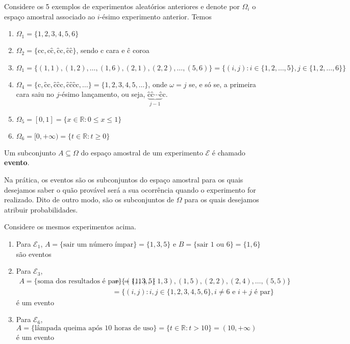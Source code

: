 \documentclass[../Notas.tex]{subfiles}
\begin{document}
\begin{examples}
Considere os 5 exemplos de experimentos aleatórios anteriores e denote por $\Omega_i$ o espaço amostral associado ao $i$-ésimo experimento anterior. Temos
\begin{enumerate}[1)]
    \item $\Omega_1 = \{1, 2, 3, 4, 5, 6\}$
    \item $\Omega_2 = \{\text{cc}, \text{cĉ}, \text{ĉc}, \text{ĉĉ}\}$, sendo c cara e ĉ coroa
    \item $\Omega_1 = \{ (1,1), (1,2), \dots, (1,6), (2,1), (2,2), \dots, (5,6) \} = \{ (i,j) : i\in \{ 1,2,\dots, 5\}, j\in \{ 1,2,\dots, 6 \} \}$
    \item $\Omega_4 = \{ \text{c}, \text{ĉc}, \text{ĉĉc}, \text{ĉĉĉc}, \dots \} = \{ 1,2,3,4,5, \dots \}$, onde $\omega = j$ se, e só se, a primeira cara saiu no $j$-ésimo lançamento, ou seja, $\underbrace{\text{ĉĉ}\cdots\text{ĉ}}_{j-1}\text{c}.$
    \item $\Omega_5 = [0,1] = \{ x\in\mathbb{R} : 0\leq x\leq 1 \}$
    \item $\Omega_6 = [0, +\infty) = \{ t\in\mathbb{R} : t\geq 0 \}$
\end{enumerate}
\end{examples}

\begin{definition}
Um subconjunto $A\subseteq\Omega$ do espaço amostral de um experimento $\mathcal{E}$ é chamado {\bf evento}.
\end{definition}

Na prática, os eventos são os subconjuntos do espaço amostral para os quais desejamos saber o quão provável será a sua ocorrência quando o experimento for realizado. Dito de outro modo, são os subconjuntos de $\Omega$ para os quais desejamos atribuir probabilidades.

\begin{examples}
Considere os mesmos experimentos acima.
\begin{enumerate}[1)]
    \item Para $\mathcal{E}_1$, $A = \{ \text{sair um número ímpar} \} = \{ 1,3,5 \}$ e $B = \{ \text{sair 1 ou 6} \} = \{ 1,6 \}$ são eventos
    \item Para $\mathcal{E}_3$, 
    \begin{align*}
    A = \{ \text{soma dos resultados é par} \} = \{ 1,3,5 \}
    &= \{ (1,1), (1,3), (1,5), (2,2), (2,4), \dots, (5,5) \} \\
    &= \{ (i,j) : i,j\in \{1,2,3,4,5,6\}, i\neq 6 \text{ e } i+j \text{ é par} \}
    \end{align*}
    é um evento
    \item Para $\mathcal{E}_6$, $A = \{ \text{lâmpada queima após 10 horas de uso} \} = \{ t\in\mathbb{R} : t > 10 \} = (10, +\infty)$
    é um evento
\end{enumerate}
\end{examples}
\end{document}
